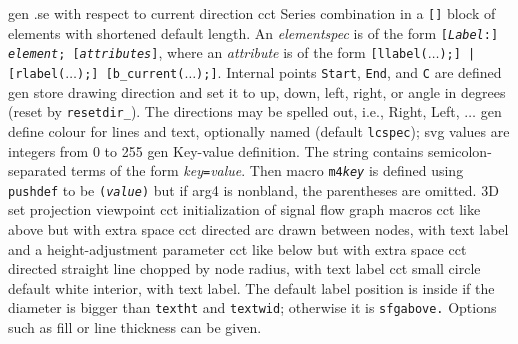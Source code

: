   {gen}
  {.se with respect to current direction}
  {cct}
  { Series combination in a {\tt []} block of elements
    with shortened default length.  An {\sl elementspec} is of the form
    {\tt [{\sl Label}:] {\sl element}; [{\sl attributes}]},
    where an {\sl attribute} is of the form
    {\tt [llabel($\ldots$);] | [rlabel($\ldots$);] [b\_current($\ldots$);]}.
    Internal points {\tt Start}, {\tt End}, and {\tt C} are defined
    }
  {gen}
  {store drawing direction and set it to
    up, down, left, right, or angle in degrees (reset by {\tt resetdir\_}).
    The directions may be spelled out, i.e., Right, Left, $\ldots$
   }
  {gen}
  {define colour for lines and text, optionally named (default {\tt lcspec});
   svg values are integers from 0 to 255}
  {gen}
  {Key-value definition. The string contains semicolon-separated terms
   of the form {\sl key}{\tt =}{\sl value}.  Then macro {\tt m4{\sl key}}
   is defined using {\tt pushdef} to be {\tt ({\sl value})} but if arg4 is
   nonbland, the parentheses are omitted.}
  {3D}
  {set projection viewpoint}
  {cct}
  {initialization of signal flow graph macros}
  {cct}
  {like above but with extra space}
  {cct}
  {directed arc drawn between nodes, with text label
    and a height-adjustment parameter }
  {cct}
  {like below but with extra space}
  {cct}
  {directed straight line chopped by node radius, with text label}
  {cct}
  {small circle default white interior, with text label. The default label
  position is inside if the diameter is bigger than {\tt textht} and
  {\tt textwid}; otherwise it is {\tt sfgabove.} Options such as fill or
  line thickness can be given.}

